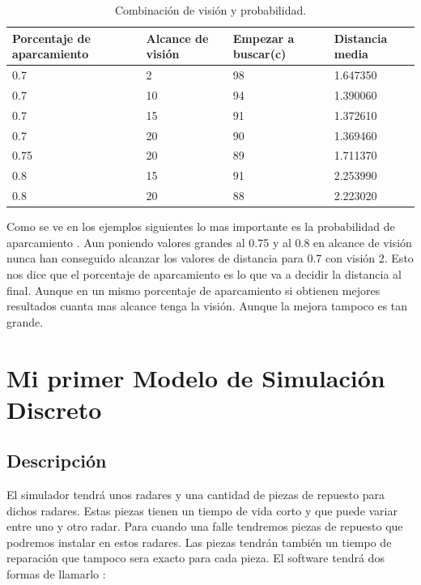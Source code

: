 \documentclass[]{article}
\begin{document}
 \begin{table}[H]
	\begin{center}
		\resizebox{12.5cm}{!} {
			\begin{tabular}{|l|l|l|l|}
				\hline
				Porcentaje de aparcamiento & Alcance de visión & Empezar a buscar(c) & Distancia media \\
				\hline \hline
				0.7 & 2 & 98 & 1.647350
				\\ \hline
				0.7 & 10 & 94 & 1.390060
				\\ \hline
				0.7 & 15 & 91 & 1.372610
				\\ \hline
				0.7 & 20 & 90 & 1.369460
				\\ \hline
				0.75 & 20 & 89 & 1.711370
				\\ \hline
				0.8 & 15 & 91 & 2.253990	
				\\ \hline
				0.8 & 20 & 88&2.223020
				\\ \hline
			\end{tabular}
		}
		\caption{Combinación de visión y probabilidad.}
		\label{tabla:sencilla}
	\end{center}
\end{table}

Como se ve en los ejemplos siguientes lo mas importante es la probabilidad de aparcamiento
. Aun poniendo valores grandes al 0.75 y al 0.8 en alcance de visión nunca han conseguido alcanzar los valores de distancia para 0.7 con visión 2. Esto nos dice que el porcentaje de aparcamiento es lo que va a decidir la distancia al final. Aunque en un mismo porcentaje de aparcamiento si obtienen mejores resultados cuanta mas alcance tenga la visión. Aunque la mejora tampoco es tan grande.

\section{Mi primer Modelo de Simulación Discreto}
\subsection{Descripción}
 
 El simulador tendrá unos radares y una cantidad de piezas de repuesto para dichos radares. Estas piezas tienen un tiempo de vida corto y que puede variar entre uno y otro radar. Para cuando una falle tendremos piezas de repuesto que podremos instalar en estos radares. Las piezas tendrán también un tiempo de reparación que tampoco sera exacto para cada pieza. El software tendrá dos formas de llamarlo :
 
\end{document}
